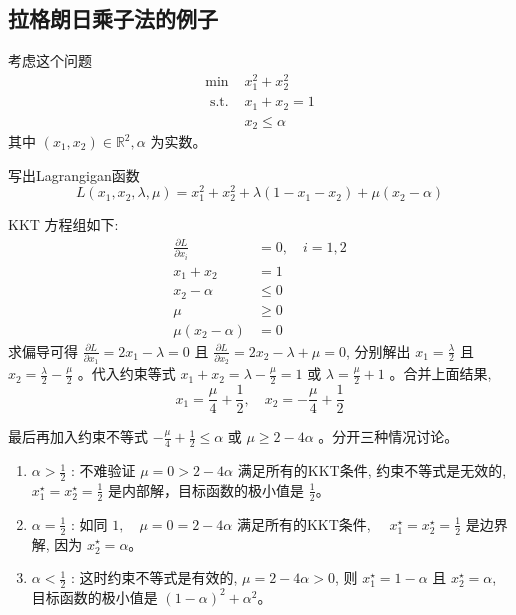 \subsection{拉格朗日乘子法的例子}

\begin{problem}

    考虑这个问题
$$
\begin{array}{ll}
\min & x_{1}^{2}+x_{2}^{2} \\
\text { s.t. } & x_{1}+x_{2}=1 \\
& x_{2} \leq \alpha
\end{array}
$$
其中 $ \left(x_{1}, x_{2}\right) \in \mathbb{R}^{2}, \alpha $ 为实数。
\end{problem}

写出Lagrangigan函数
$$
L\left(x_{1}, x_{2}, \lambda, \mu\right)=x_{1}^{2}+x_{2}^{2}+\lambda\left(1-x_{1}-x_{2}\right)+\mu\left(x_{2}-\alpha\right)
$$

KKT 方程组如下:
$$
\begin{aligned}
\frac{\partial L}{\partial x_{i}} &=0, \quad i=1,2 \\
x_{1}+x_{2} &=1 \\
x_{2}-\alpha & \leq 0 \\
\mu & \geq 0 \\
\mu\left(x_{2}-\alpha\right) &=0
\end{aligned}
$$
求偏导可得 $ \frac{\partial L}{\partial x_{1}}=2 x_{1}-\lambda=0 $ 且 $ \frac{\partial L}{\partial x_{2}}=2 x_{2}-\lambda+\mu=0 $, 分别解出 $ x_{1}=\frac{\lambda}{2} $ 且 $ x_{2}=\frac{\lambda}{2}-\frac{\mu}{2} $ 。代入约束等式 $ x_{1}+x_{2}=\lambda-\frac{\mu}{2}=1 $ 或 $ \lambda=\frac{\mu}{2}+1 $ 。合并上面结果,
$$
x_{1}=\frac{\mu}{4}+\frac{1}{2}, \quad x_{2}=-\frac{\mu}{4}+\frac{1}{2}
$$

最后再加入约束不等式 $ -\frac{\mu}{4}+\frac{1}{2} \leq \alpha $ 或 $ \mu \geq 2-4 \alpha $ 。分开三种情况讨论。

\begin{enumerate}
    \item $ \alpha>\frac{1}{2} $ : 不难验证 $ \mu=0>2-4 \alpha $ 满足所有的KKT条件, 约束不等式是无效的, $ x_{1}^{\star}=x_{2}^{\star}=\frac{1}{2} $ 是内部解，目标函数的极小值是 $ \frac{1}{2}$。
    \item $ \alpha=\frac{1}{2} $ : 如同 $ 1, \quad \mu=0=2-4 \alpha $ 满足所有的KKT条件, $ \quad x_{1}^{\star}=x_{2}^{\star}=\frac{1}{2} $ 是边界解, 因为 $ x_{2}^{\star}=\alpha $。
    \item $ \alpha<\frac{1}{2} $ : 这时约束不等式是有效的, $ \mu=2-4 \alpha>0 $, 则 $ x_{1}^{\star}=1-\alpha $ 且 $ x_{2}^{\star}=\alpha $, 目标函数的极小值是 $ (1-\alpha)^{2}+\alpha^{2} $。
\end{enumerate}

